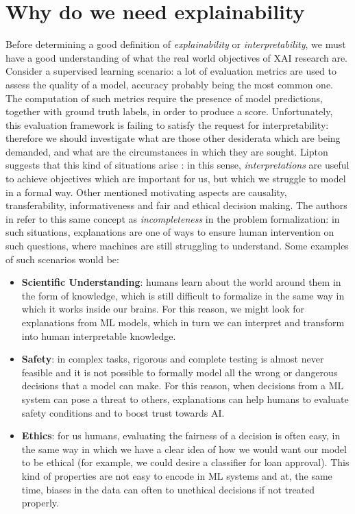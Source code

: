 \section{Why do we need explainability}
Before determining a good definition of \textit{explainability} or \textit{interpretability}, we must have a good understanding of what the real world objectives of XAI research are. Consider a supervised learning scenario: a lot of evaluation metrics are used to assess the quality of a model, accuracy probably being  the most common one. The computation of such metrics require the presence of model predictions, together with ground truth labels, in order to produce a score. Unfortunately, this evaluation framework is failing to satisfy the request for interpretability: therefore we should investigate what are those other desiderata which are being demanded, and what are the circumstances in which they are sought. Lipton \cite{lipton2017mythos} suggests that this kind of situations arise : in this sense, \textit{interpretations} are useful to achieve objectives which are important for us, but which we struggle to model in a formal way. Other mentioned motivating aspects are causality, transferability, informativeness and fair and ethical decision making.
 The authors in \cite{doshivelez2017rigorous} refer to this same concept as \textit{incompleteness} in the problem formalization: in such situations, explanations are one of ways to ensure human intervention on such questions, where machines are still struggling to understand. Some examples of such scenarios would be:
\begin{itemize}
	\item \textbf{Scientific Understanding}: humans learn about the world around them in the form of knowledge, which is still difficult to formalize in the same way in which it works inside our brains. For this reason, we might look for explanations from ML models, which in turn we can interpret and transform into human interpretable knowledge.
	\item \textbf{Safety}: in complex tasks, rigorous and complete testing is almost never feasible and it is not possible to formally model all the wrong or dangerous decisions that a model can make. For this reason, when decisions from a ML system can pose a threat to others, explanations can help humans to evaluate safety conditions and to boost trust towards AI.
	\item \textbf{Ethics}: for us humans, evaluating the fairness of a decision is often easy, in the same way in which we have a clear idea of how we would want our model to be ethical (for example, we could desire a  classifier for loan approval). This kind of properties are not easy to encode in ML systems and at, the same time, biases in the data can often to unethical decisions if not treated properly. 
\end{itemize}

